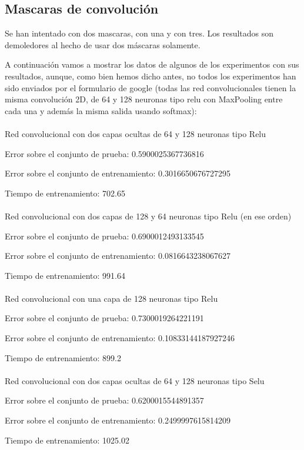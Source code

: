 \subsection{Mascaras de convolución}
Se han intentado con dos mascaras, con una y con tres. Los resultados son demoledores al hecho de usar dos máscaras solamente.

A continuación vamos a mostrar los datos de algunos de los experimentos con sus resultados, aunque, como bien hemos dicho antes, no todos los experimentos han sido enviados por el formulario de google (todas las red convolucionales tienen la misma convolución 2D, de 64 y 128 neuronas tipo relu con MaxPooling entre cada una y además la misma salida usando softmax):
\\\\
Red convolucional con dos capas ocultas de 64 y 128 neuronas tipo Relu

Error sobre el conjunto de prueba: 0.5900025367736816

Error sobre el conjunto de entrenamiento: 0.3016650676727295

Tiempo de entrenamiento: 702.65
\\\\

Red convolucional con dos capas de 128 y 64 neuronas tipo Relu (en ese orden)

Error sobre el conjunto de prueba: 0.6900012493133545

Error sobre el conjunto de entrenamiento: 0.0816643238067627

Tiempo de entrenamiento: 991.64
\\\\

Red convolucional con una capa de 128 neuronas tipo Relu

Error sobre el conjunto de prueba: 0.7300019264221191

Error sobre el conjunto de entrenamiento: 0.10833144187927246

Tiempo de entrenamiento: 899.2
\\\\
\newpage
Red convolucional con dos capas ocultas de 64 y 128 neuronas tipo Selu

Error sobre el conjunto de prueba: 0.6200015544891357

Error sobre el conjunto de entrenamiento: 0.2499997615814209

Tiempo de entrenamiento: 1025.02
\\\\

